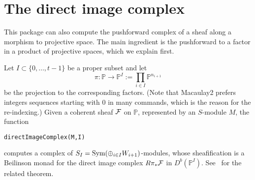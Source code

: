 \documentclass[twoside,12pt, leqno]{amsart}
\def\PP{{\mathbb P}}
\def\P{{\mathbb P}}
\begin{document}
%


\section{The direct image complex}\label{sec:push forward}
This package can also compute the pushforward complex of a sheaf along a morphism
to projective space. The main ingredient is the pushforward to a factor in a product of projective
spaces, which we explain first. 

Let $I \subset \{0,\ldots,t-1 \}$ be a proper subset and let
$$ \pi \colon\PP \to  \PP^I:=\prod_{i \in  I} \PP^{n_{i+1}}$$
be the projection to the corresponding factors. (Note that Macaulay2 prefers integers sequences starting with $0$ in many commands, which is the reason for the re-indexing.) Given a coherent sheaf ${\mathcal F}$ on $\PP$, represented by an $S$-module $M$,
the function
{\small \begin{verbatim}
directImageComplex(M,I)
\end{verbatim}}
\noindent computes a complex of $S_I = \operatorname{Sym} (\oplus_{i \in I} W_{i+1})$-modules, whose sheafification
is a Beilinson monad for the direct image complex $R\pi_* {\mathcal F}$ in $D^b(\PP^I)$.   See~\cite[Corollary 0.3]{EES} for the related theorem.
\end{document}
